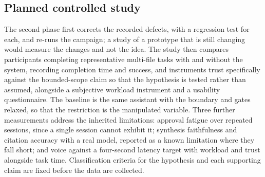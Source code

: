 \subsection{Planned controlled study}
\label{sec:study}
The second phase first corrects the recorded defects, with a regression test for each, and re-runs the campaign; a study of a prototype that is still changing would measure the changes and not the idea. The study then compares participants completing representative multi-file tasks with and without the system, recording completion time and success, and instruments trust specifically against the bounded-scope claim so that the hypothesis is tested rather than assumed, alongside a subjective workload instrument and a usability questionnaire. The baseline is the same assistant with the boundary and gates relaxed, so that the restriction is the manipulated variable. Three further measurements address the inherited limitations: approval fatigue over repeated sessions, since a single session cannot exhibit it; synthesis faithfulness and citation accuracy with a real model, reported as a known limitation where they fall short; and voice against a four-second latency target with workload and trust alongside task time. Classification criteria for the hypothesis and each supporting claim are fixed before the data are collected.
